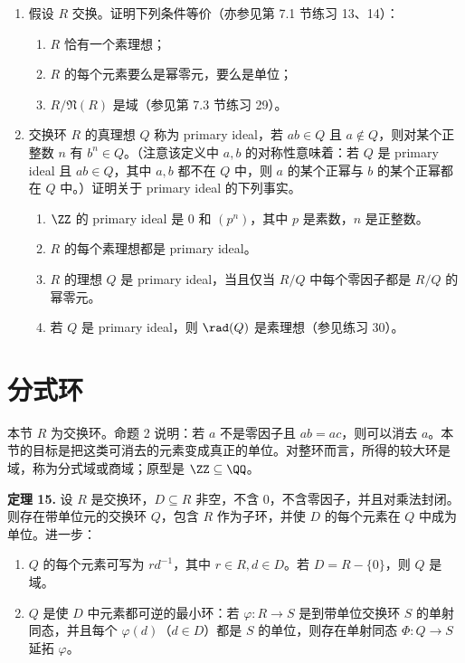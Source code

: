 \begin{enumerate}[label=\arabic*.]
\begin{enumerate}[label=(\alph*)]
		\item 证明 $A_k$ 是主理想，且 $A_0\supseteq A_1\supseteq A_2\supseteq\cdots$。
		\item 证明若 $I$ 是 $R$ 的任意非零理想，则 $I=A_k$ 对某个 $k\geq0$ 成立。推出 $R$ 是以 $A_1$ 为唯一极大理想的局部环。
	\end{enumerate}
	\item 假设 $R$ 交换。证明下列条件等价（亦参见第 7.1 节练习 13、14）：
	\begin{enumerate}[label=(\roman*)]
		\item $R$ 恰有一个素理想；
		\item $R$ 的每个元素要么是幂零元，要么是单位；
		\item $R/\mathfrak N(R)$ 是域（参见第 7.3 节练习 29）。
	\end{enumerate}
	\item 交换环 $R$ 的真理想 $Q$ 称为 primary ideal，若 $ab\in Q$ 且 $a\notin Q$，则对某个正整数 $n$ 有 $b^n\in Q$。（注意该定义中 $a,b$ 的对称性意味着：若 $Q$ 是 primary ideal 且 $ab\in Q$，其中 $a,b$ 都不在 $Q$ 中，则 $a$ 的某个正幂与 $b$ 的某个正幂都在 $Q$ 中。）证明关于 primary ideal 的下列事实。
	\begin{enumerate}[label=(\alph*)]
		\item $\ZZ$ 的 primary ideal 是 $0$ 和 $(p^n)$，其中 $p$ 是素数，$n$ 是正整数。
		\item $R$ 的每个素理想都是 primary ideal。
		\item $R$ 的理想 $Q$ 是 primary ideal，当且仅当 $R/Q$ 中每个零因子都是 $R/Q$ 的幂零元。
		\item 若 $Q$ 是 primary ideal，则 $\rad(Q)$ 是素理想（参见练习 30）。
	\end{enumerate}
\end{enumerate}



\section{分式环}

本节 $R$ 为交换环。命题 2 说明：若 $a$ 不是零因子且 $ab=ac$，则可以消去 $a$。本节的目标是把这类可消去的元素变成真正的单位。对整环而言，所得的较大环是域，称为分式域或商域；原型是 $\ZZ\subseteq\QQ$。

\medskip
\noindent\textbf{定理 15.} 设 $R$ 是交换环，$D\subseteq R$ 非空，不含 $0$，不含零因子，并且对乘法封闭。则存在带单位元的交换环 $Q$，包含 $R$ 作为子环，并使 $D$ 的每个元素在 $Q$ 中成为单位。进一步：
\begin{enumerate}[label=(\arabic*)]
  \item $Q$ 的每个元素可写为 $rd^{-1}$，其中 $r\in R,d\in D$。若 $D=R-\{0\}$，则 $Q$ 是域。
  \item $Q$ 是使 $D$ 中元素都可逆的最小环：若 $\varphi:R\to S$ 是到带单位交换环 $S$ 的单射同态，并且每个 $\varphi(d)$（$d\in D$）都是 $S$ 的单位，则存在单射同态 $\Phi:Q\to S$ 延拓 $\varphi$。
\end{enumerate}

